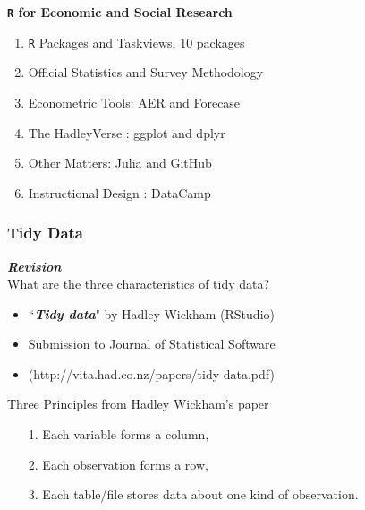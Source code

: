 \documentclass{beamer}
\begin{document}
\begin{frame}
\textbf{\texttt{R} for Economic and Social Research}
\begin{enumerate}
\item \texttt{R} Packages and Taskviews, 10 packages
\item Official Statistics and Survey Methodology
\item Econometric Tools: AER and Forecase
\item The HadleyVerse : ggplot and dplyr
\item Other Matters:  Julia and GitHub
\item Instructional Design : DataCamp
\end{enumerate}
\end{frame}
\begin{frame}
\frametitle{Tidy Data}
\textbf{\textit{Revision}}\\
What are the three characteristics of tidy data?

\begin{itemize}
	\item ``\textit{\textbf{Tidy data}}" by Hadley Wickham (RStudio)
	\item Submission to Journal of Statistical Software
	\item (http://vita.had.co.nz/papers/tidy-data.pdf)
\end{itemize}

\end{frame}
\begin{frame}

Three Principles from Hadley Wickham's paper
\begin{itemize}
	\item[1.] Each variable forms a column, 
	\item[2.] Each observation forms a row, 
	\item[3.] Each table/file stores data about one kind of observation.
\end{itemize}
\end{frame}
\end{document}
